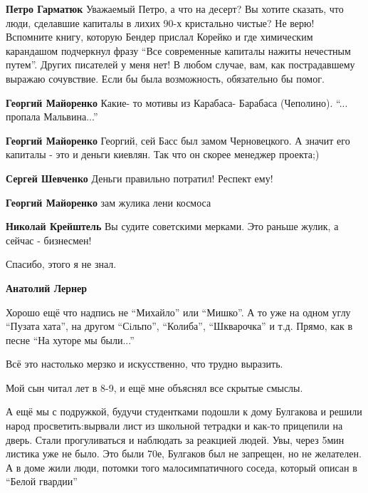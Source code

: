 \begin{itemize}
\begin{itemize}
\begin{itemize}
\textbf{Петро Гарматюк} Уважаемый Петро, а что на десерт? Вы хотите сказать, что люди, сделавшие капиталы в лихих 90-х кристально чистые? Не верю! Вспомните книгу, которую Бендер прислал Корейко и где химическим карандашом подчеркнул фразу \enquote{Все современные капиталы нажиты нечестным путем}. Других писателей у меня нет! В любом случае, вам, как пострадавшему выражаю сочувствие. Если бы была возможность, обязательно бы помог.

\textbf{Георгий Майоренко}
Какие- то мотивы из Карабаса- Барабаса (Чеполино).
\enquote{... пропала Мальвина...}
\end{itemize} %

\textbf{Георгий Майоренко} Георгий, сей Басс был замом Черновецкого. А значит его капиталы - это и деньги киевлян. Так что он скорее менеджер проекта;)

\textbf{Сергей Шевченко} Деньги правильно потратил! Респект ему!

\textbf{Георгий Майоренко} зам жулика лени космоса

\textbf{Николай Крейштель} Вы судите советскими мерками. Это раньше жулик, а сейчас - бизнесмен!
\end{itemize} %

Спасибо, этого я не знал.

\begin{itemize} %
\textbf{Анатолий Лернер} 

Хорошо ещё что надпись не \enquote{Михайло} или \enquote{Мишко}. А то уже на одном углу \enquote{Пузата
хата}, на другом \enquote{Сiльпо}, \enquote{Колиба}, \enquote{Шкварочка} и т.д. Прямо, как в песне \enquote{На
хуторе мы были...}

Всё это настолько мерзко и искусственно, что трудно выразить.
\end{itemize} %


Мой сын читал лет в 8-9, и ещё мне объяснял все скрытые смыслы.

А ещё мы с подружкой, будучи студентками подошли к дому Булгакова и решили народ
просветить:вырвали лист из школьной тетрадки и как-то прицепили на дверь. Стали
прогуливаться и наблюдать за реакцией людей. Увы, через 5мин листика уже не
было. Это были 70е, Булгаков был не запрещен, но не желателен. А в доме жили
люди, потомки того малосимпатичного соседа, который описан в \enquote{Белой гвардии}


\end{itemize}
